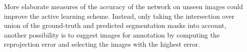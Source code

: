 More elaborate measures of the accuracy of the network on unseen images could improve the active learning scheme. Instead, only taking the intersection over union of the ground-truth and predicted segmentation masks into account, another possibility is to suggest images for annotation by computing the reprojection error and selecting the images with the highest error.